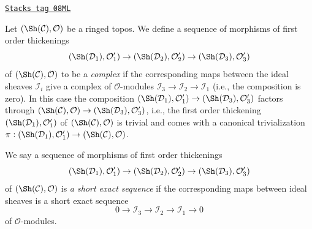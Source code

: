 \begin{remark}
\label{defos-remark-short-exact-sequence-thickenings-ringed-topoi}
\href{https://stacks.math.columbia.edu/tag/08ML}{\texttt{Stacks tag 08ML}}

Let $(\Sh(\mathcal{C}), \mathcal{O})$ be a ringed topos.
We define a sequence of morphisms of first order thickenings
$$
(\Sh(\mathcal{D}_1), \mathcal{O}'_1) \to
(\Sh(\mathcal{D}_2), \mathcal{O}'_2) \to
(\Sh(\mathcal{D}_3), \mathcal{O}'_3)
$$
of $(\Sh(\mathcal{C}), \mathcal{O})$ to be a {\it complex}
if the corresponding maps between
the ideal sheaves $\mathcal{I}_i$
give a complex of $\mathcal{O}$-modules
$\mathcal{I}_3 \to \mathcal{I}_2 \to \mathcal{I}_1$
(i.e., the composition is zero). In this case the composition
$(\Sh(\mathcal{D}_1), \mathcal{O}'_1) \to
(\Sh(\mathcal{D}_3), \mathcal{O}'_3)$ factors through
$(\Sh(\mathcal{C}), \mathcal{O}) \to
(\Sh(\mathcal{D}_3), \mathcal{O}'_3)$, i.e.,
the first order thickening
$(\Sh(\mathcal{D}_1), \mathcal{O}'_1)$ of
$(\Sh(\mathcal{C}), \mathcal{O})$ is trivial and comes with
a canonical trivialization
$\pi : (\Sh(\mathcal{D}_1), \mathcal{O}'_1) \to
(\Sh(\mathcal{C}), \mathcal{O})$.

\medskip\noindent
We say a sequence of morphisms of first order thickenings
$$
(\Sh(\mathcal{D}_1), \mathcal{O}'_1) \to
(\Sh(\mathcal{D}_2), \mathcal{O}'_2) \to
(\Sh(\mathcal{D}_3), \mathcal{O}'_3)
$$
of $(\Sh(\mathcal{C}), \mathcal{O})$ is {\it a short exact sequence} if the
corresponding maps between ideal sheaves is a short exact sequence
$$
0 \to \mathcal{I}_3 \to \mathcal{I}_2 \to \mathcal{I}_1 \to 0
$$
of $\mathcal{O}$-modules.
\end{remark}


